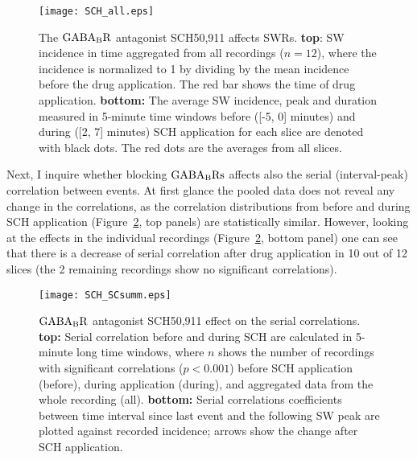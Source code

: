     \begin{figure}
      \center
      \texttt{[image: SCH\_all.eps]}
      \caption{
        The $\rm GABA_BR$ antagonist SCH50,911 affects SWRs. {\bf top}:
        SW incidence in time aggregated from all recordings ($n=12$), where the
        incidence is normalized to 1 by dividing by the mean incidence before
        the drug application. The red bar shows the time of drug application.
        {\bf bottom:} The average SW incidence, peak and duration measured in
        5-minute time windows before ([-5, 0] minutes) and during ([2, 7]
        minutes) SCH application for each slice are denoted with black dots.
        The red dots are the averages from all slices.
            }
    \label{gB_summ}
    \end{figure}

    Next, I inquire whether blocking $\rm GABA_B Rs$ affects also the serial
    (interval-peak) correlation between events. At first glance the pooled data
    does not reveal any change in the correlations, as the correlation
    distributions from before and during SCH application
    (Figure~\ref{gB_SCsumm}, top panels) are statistically similar. However,
    looking at the effects in the individual recordings
    (Figure~\ref{gB_SCsumm}, bottom panel) one can see that there is a decrease
    of serial correlation after drug application in 10 out of 12 slices (the 2
    remaining recordings show no significant correlations).

    \begin{figure}
      \center
      \texttt{[image: SCH\_SCsumm.eps]}
      \caption{
        $\rm GABA_BR$ antagonist SCH50,911 effect on the serial
        correlations. \textbf{top:} Serial correlation before and during
        SCH are calculated in 5-minute long time windows, where $n$ shows
        the number of recordings with significant correlations ($p<0.001$)
        before SCH application (before), during application (during), and
        aggregated data from the whole recording (all). \textbf{bottom:} Serial
        correlations coefficients between time interval since last event and
        the following SW peak are plotted against recorded incidence; arrows
        show the change after SCH application.
            }
    \label{gB_SCsumm}
    \end{figure}


